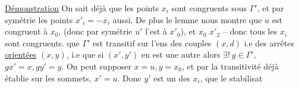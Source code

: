 \uline{Démonstration} On sait déjà que les points $x_i$  sont congruents sous $\Gamma'$, et par symétrie les points $x'_i=-x_i$ aussi. De plus le lemme nous montre que $u$ est congruent à $x_0$,  (donc par symétrie $u'$ l'est à $x'_0$), et  $x_0$  $x'_2$ -- donc tous les $x_i$ sont congruents.   que $\Gamma'$ est  transitif sur l'ens des couples $(x,d)$ i.e des arrêtes \uline{orientées} $(x,y)$,  i.e que si $(x',y')$ en est une autre alors $\exists!\ g\in\Gamma'$, $gx'=x,gy'=y$. On peut supposer $x=u,y=x_0$, et par la transitivité déjà établie sur les sommets, $x'=u$. Donc   $y'$ est un des $x_i$,   que le stabilisat
